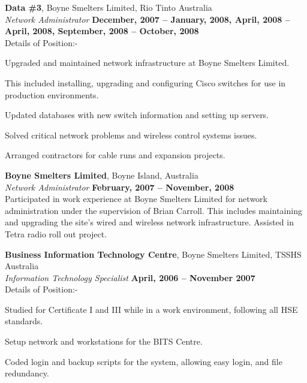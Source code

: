 \documentclass[margin,line]{resume}
\begin{document}
\begin{resume}
    {\bf Data \#3}, Boyne Smelters Limited, Rio Tinto Australia \vspace{2mm}\\\vspace{1mm}%
    {\sl Network Administrator} \hfill {\bf December, 2007  -- January, 2008, April, 2008 -- April, 2008, September, 2008 -- October, 2008 }\\
    Details of Position:-
    \begin{list2}
        \vspace*{1mm}
\item Upgraded and maintained network infrastructure at Boyne Smelters Limited. 
\item This included installing, upgrading and configuring Cisco switches for use in production environments. 
\item Updated databases with new switch information and setting up servers. 
\item Solved critical network problems and wireless control systems issues. 
\item Arranged contractors for cable runs and expansion projects. 
\end{list2}

    {\bf Boyne Smelters Limited}, Boyne Island, Australia \vspace{2mm}\\\vspace{1mm}%
    {\sl Network Administrator} \hfill {\bf February, 2007 -- November, 2008} \\
Participated in work experience at Boyne Smelters Limited for network administration under the supervision of Brian Carroll. This includes maintaining and upgrading the site's wired and wireless network infrastructure. Assisted in Tetra radio roll out project.

    {\bf Business Information Technology Centre}, Boyne Smelters Limited, TSSHS Australia \vspace{2mm}\\\vspace{1mm}%
    {\sl Information Technology Specialist} \hfill {\bf April, 2006 -- November 2007}\\
    Details of Position:-
    \begin{list2}
        \vspace*{1mm}
\item Studied for Certificate I and III while in a work environment, following all HSE standards. 
\item Setup network and workstations for the BITS Centre. 
\item Coded login and backup scripts for the system, allowing easy login, and file redundancy. 
\end{list2}



\end{resume}
\end{document}
